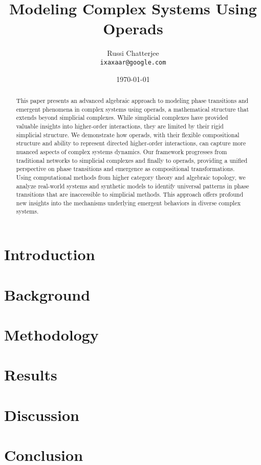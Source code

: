 \documentclass[12pt,a4paper]{article}
\title{Modeling Complex Systems Using Operads}
\author{Russi Chatterjee \\ \texttt{ixaxaar@google.com}}
\date{\today}
\begin{document}
\maketitle

\thispagestyle{empty}

\begin{abstract}
\noindent
This paper presents an advanced algebraic approach to modeling phase transitions and emergent phenomena in complex systems using operads, a mathematical structure that extends beyond simplicial complexes. While simplicial complexes have provided valuable insights into higher-order interactions, they are limited by their rigid simplicial structure. We demonstrate how operads, with their flexible compositional structure and ability to represent directed higher-order interactions, can capture more nuanced aspects of complex systems dynamics. Our framework progresses from traditional networks to simplicial complexes and finally to operads, providing a unified perspective on phase transitions and emergence as compositional transformations. Using computational methods from higher category theory and algebraic topology, we analyze real-world systems and synthetic models to identify universal patterns in phase transitions that are inaccessible to simplicial methods. This approach offers profound new insights into the mechanisms underlying emergent behaviors in diverse complex systems.
\end{abstract}

\vspace{1cm}
\section{Introduction}


\section{Background}


\section{Methodology}


\section{Results}


\section{Discussion}


\section{Conclusion}




\end{document}
